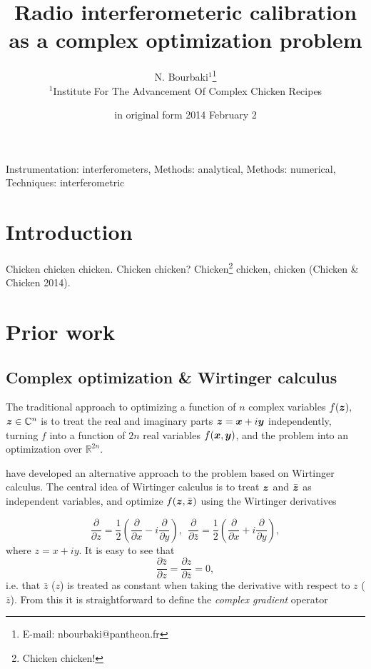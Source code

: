 \documentclass[useAMS,usenatbib]{mn2e}
\title[Radio interferometeric calibration as a complex optimization problem]{Radio interferometeric calibration as a complex optimization problem}
\author[N. Bourbaki]{N. Bourbaki$^1$\thanks{E-mail: nbourbaki@pantheon.fr}\\ 
$^1$Institute For The Advancement Of Complex Chicken Recipes}
\newcommand{\COMPLEX}{\mathbb{C}}
\newcommand{\REAL}{\mathbb{R}}
\newcommand{\zz}{\bmath{z}}
\begin{document}
\date{in original form 2014 February 2}

\pagerange{\pageref{firstpage}--\pageref{lastpage}} 

\maketitle

\label{firstpage}

\begin{abstract}
\end{abstract}

\begin{keywords}
Instrumentation: interferometers, Methods: analytical, Methods: numerical, Techniques: interferometric
\end{keywords}

\section{Introduction}

Chicken chicken chicken. Chicken chicken? Chicken\footnote{Chicken chicken!} chicken, chicken (Chicken \& Chicken 2014).

\section{Prior work}

\subsection{Complex optimization \& Wirtinger calculus}

The traditional approach to optimizing a function of $n$ complex variables $f(\zz),$ $\zz\in\COMPLEX^n$ is
to treat the real and imaginary parts $\zz=\bmath{x}+i\bmath{y}$ independently, turning $f$ into a function
of $2n$ real variables $f(\bmath{x},\bmath{y})$, and the problem into an optimization over $\REAL^{2n}$.

\citet{ComplexOpt} have developed an alternative approach to the problem based on Wirtinger calculus. The central idea
of Wirtinger calculus is to treat $\zz$ and $\bar{\zz}$ as independent variables, and optimize $f(\zz,\bar{\zz})$
using the Wirtinger derivatives 

\[
\frac{\partial}{\partial z} = \frac{1}{2}\left ( \frac{\partial}{\partial x} - i\frac{\partial}{\partial y} \right),~~
\frac{\partial}{\partial \bar{z}} = \frac{1}{2}\left ( \frac{\partial}{\partial x} + i\frac{\partial}{\partial y} \right),
\]
where $z=x+iy$. It is easy to see that  
\[
\frac{\partial \bar z}{\partial z} = 
\frac{\partial z}{\partial \bar z} = 0,
\]
i.e. that $\bar z$ ($z$) is treated as constant when taking the derivative with respect to $z$ ($\bar z$). From this 
it is straightforward to define the \emph{complex gradient} operator 
\end{document}
